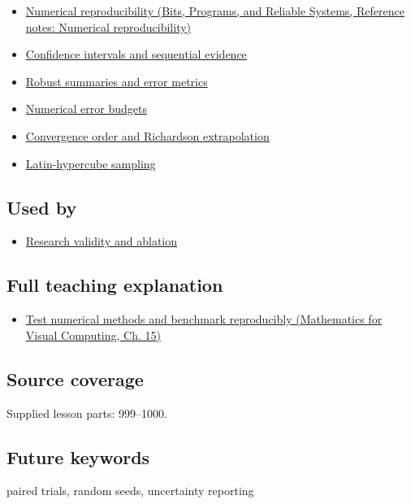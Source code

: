 \begin{itemize}
\tightlist
\item
  \href{../01-Bits-Programs-and-Reliable-Systems/main.pdf\#nameddest=appendix-5f1a2c3f97ff}{Numerical reproducibility (Bits, Programs, and Reliable Systems, Reference notes: Numerical reproducibility)}
\item
  \hyperref[appendix-c83016554b1e]{Confidence intervals and sequential evidence}
\item
  \hyperref[appendix-bcc44e9d3d02]{Robust summaries and error metrics}
\item
  \hyperref[appendix-31b8c295e05f]{Numerical error budgets}
\item
  \hyperref[appendix-aca80b6bf17a]{Convergence order and Richardson extrapolation}
\item
  \hyperref[appendix-1c5e85693a06]{Latin-hypercube sampling}
\end{itemize}

\subsection{Used by}\label{appendix-b9db93e28371-used-by}

\hypertarget{appendix-b9db93e28371-used-by}{}

\begin{itemize}
\tightlist
\item
  \hyperref[appendix-65788587ef78]{Research validity and ablation}
\end{itemize}

\subsection{Full teaching explanation}\label{appendix-b9db93e28371-full-teaching-explanation}

\hypertarget{appendix-b9db93e28371-full-teaching-explanation}{}

\begin{itemize}
\tightlist
\item
  \href{../02-Mathematics-for-Visual-Computing/main.pdf\#nameddest=02-foundations-ii-ch031-test-numerical-methods-and-benchmark-reproducibly}{Test numerical methods and benchmark reproducibly (Mathematics for Visual Computing, Ch. 15)}
\end{itemize}

\subsection{Source coverage}\label{appendix-b9db93e28371-source-coverage}

\hypertarget{appendix-b9db93e28371-source-coverage}{}

Supplied lesson parts: 999--1000.

\subsection{Future keywords}\label{appendix-b9db93e28371-future-keywords}

\hypertarget{appendix-b9db93e28371-future-keywords}{}

paired trials, random seeds, uncertainty reporting
